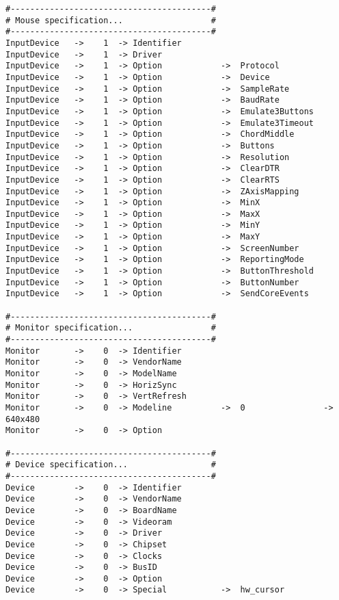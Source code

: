 \begin{verbatim}
#-----------------------------------------#
# Mouse specification...                  #
#-----------------------------------------#
InputDevice   ->    1  -> Identifier
InputDevice   ->    1  -> Driver
InputDevice   ->    1  -> Option            ->  Protocol
InputDevice   ->    1  -> Option            ->  Device
InputDevice   ->    1  -> Option            ->  SampleRate
InputDevice   ->    1  -> Option            ->  BaudRate
InputDevice   ->    1  -> Option            ->  Emulate3Buttons
InputDevice   ->    1  -> Option            ->  Emulate3Timeout
InputDevice   ->    1  -> Option            ->  ChordMiddle
InputDevice   ->    1  -> Option            ->  Buttons
InputDevice   ->    1  -> Option            ->  Resolution
InputDevice   ->    1  -> Option            ->  ClearDTR
InputDevice   ->    1  -> Option            ->  ClearRTS
InputDevice   ->    1  -> Option            ->  ZAxisMapping
InputDevice   ->    1  -> Option            ->  MinX
InputDevice   ->    1  -> Option            ->  MaxX
InputDevice   ->    1  -> Option            ->  MinY
InputDevice   ->    1  -> Option            ->  MaxY
InputDevice   ->    1  -> Option            ->  ScreenNumber
InputDevice   ->    1  -> Option            ->  ReportingMode
InputDevice   ->    1  -> Option            ->  ButtonThreshold
InputDevice   ->    1  -> Option            ->  ButtonNumber
InputDevice   ->    1  -> Option            ->  SendCoreEvents

#-----------------------------------------#
# Monitor specification...                #
#-----------------------------------------#
Monitor       ->    0  -> Identifier
Monitor       ->    0  -> VendorName
Monitor       ->    0  -> ModelName
Monitor       ->    0  -> HorizSync
Monitor       ->    0  -> VertRefresh
Monitor       ->    0  -> Modeline          ->  0                -> 640x480
Monitor       ->    0  -> Option

#-----------------------------------------#
# Device specification...                 #
#-----------------------------------------#
Device        ->    0  -> Identifier
Device        ->    0  -> VendorName
Device        ->    0  -> BoardName
Device        ->    0  -> Videoram
Device        ->    0  -> Driver
Device        ->    0  -> Chipset
Device        ->    0  -> Clocks
Device        ->    0  -> BusID
Device        ->    0  -> Option
Device        ->    0  -> Special           ->  hw_cursor


\end{verbatim}

